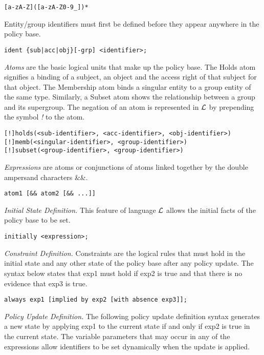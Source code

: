\documentclass{llncs}
\begin{document}
    \begin{verbatim}[a-zA-Z]([a-zA-Z0-9_])*\end{verbatim}

    Entity/group identifiers must first be defined before they appear
    anywhere in the policy base.

    \begin{verbatim}ident {sub|acc|obj}[-grp] <identifier>;\end{verbatim}

    \emph{Atoms} are the basic logical units that make up the policy base.
    The Holds atom signifies a binding of a subject, an object and the
    access right of that subject for that object. The Membership atom binds
    a singular entity to a group entity of the same type. Similarly, a Subset
    atom shows the relationship between a group and its supergroup. The
    negation of an atom is represented in $\cal{L}$ by prepending the symbol
    \emph{!} to the atom.

    \begin{verbatim}[!]holds(<sub-identifier>, <acc-identifier>, <obj-identifier>)
[!]memb(<singular-identifier>, <group-identifier>)
[!]subset(<group-identifier>, <group-identifier>)\end{verbatim}

    \emph{Expressions} are atoms or conjunctions of atoms linked together by
    the double ampersand characters \&\&.

    \begin{verbatim}atom1 [&& atom2 [&& ...]]\end{verbatim}

    \emph{Initial State Definition.} This feature of language $\cal{L}$ allows
    the initial facts of the policy base to be set.

    \begin{verbatim}initially <expression>;\end{verbatim}

    \emph{Constraint Definition.} Constraints are the logical rules that must
    hold in the initial state and any other state of the policy base after
    any policy update. The syntax below states that exp1 must hold if exp2 is 
    true and that there is no evidence that exp3 is true.

    \begin{verbatim}always exp1 [implied by exp2 [with absence exp3]];\end{verbatim}

    \emph{Policy Update Definition.} The following policy update definition
    syntax generates a new state by applying exp1 to the current state
    if and only if exp2 is true in the current state. The variable
    parameters that may occur in any of the expressions allow identifiers
    to be set dynamically when the update is applied.
\end{document}
